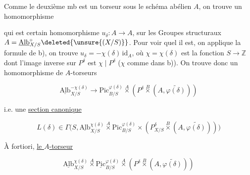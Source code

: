 
Comme le deuxième mb est un torseur sous le schéma abélien $A$, on trouve  un homomorphisme


qui est   certain homomorphisme $u_\delta:A\longrightarrow A$, sur les Groupes structuraux $A=\underline{\mathrm{Alb}}^\circ_{X/S}\deleted{\unsure{(X/S)}}$. Pour voir quel il est, on applique la formule \inserted{$(*)$} de b), on trouve $u_\delta=-\chi(\delta)\,\mathrm{id}_A$, où $\chi=\chi(\delta)$ est la fonction $S\longrightarrow\mathbb Z$ dont l'image inverse sur $P^\delta$ est $\chi\mid P^\delta$ ($\chi$ comme dans b)). On trouve donc un  homomorphisme de $A$-torseurs


\[
\underline{\mathrm{Alb}}^{-\chi(\delta)}_{X/S}\longrightarrow
\mathrm{Pic}^{\varphi(\delta)}_{B/S}\overset{A}{\times}
(P^\delta\overset B\times(A,\widetilde{\varphi(\delta)}))
\]

i.e. une \uline{section canonique}

\[
\boxed{L(\delta)\in\Gamma\bigl(S,\underline{\mathrm{Alb}}^{\chi(\delta)}_{X/S}
\overset A\times\mathrm{Pic}_{B/S}^{\varphi(\delta)}\times
(P^\delta_{X/S}\overset B\times(A,\widetilde{\varphi(\delta)}))\bigr)}
\]

À fortiori, \uline{le $A$-torseur}

\[
\underline{\mathrm{Alb}}^{\chi(\delta)}_{X/S}\overset A\times\underline{\mathrm{Pic}}^{\varphi(\delta)}_{B/S}\overset A\times(P^\delta\overset B\times(A,\widetilde{\varphi(\delta)}))
\]

